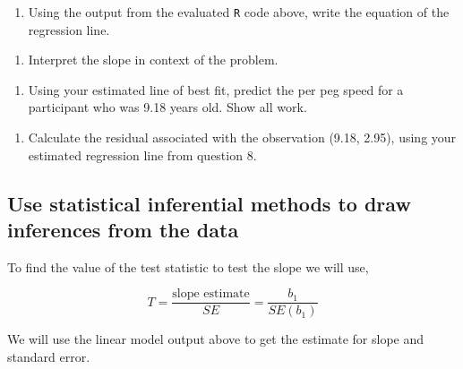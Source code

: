 \documentclass[
]{report}
\providecommand{\tightlist}{%
  \setlength{\itemsep}{0pt}\setlength{\parskip}{0pt}}
\begin{document}
\begin{enumerate}
\def\labelenumi{\arabic{enumi}.}
\setcounter{enumi}{7}
\tightlist
\item
  Using the output from the evaluated \texttt{R} code above, write the equation of the regression line.
\end{enumerate}

\vspace{1in}

\begin{enumerate}
\def\labelenumi{\arabic{enumi}.}
\setcounter{enumi}{8}
\tightlist
\item
  Interpret the slope in context of the problem.
\end{enumerate}

\vspace{1in}

\begin{enumerate}
\def\labelenumi{\arabic{enumi}.}
\setcounter{enumi}{9}
\tightlist
\item
  Using your estimated line of best fit, predict the per peg speed for a participant who was 9.18 years old. Show all work.
\end{enumerate}

\vspace{1in}

\begin{enumerate}
\def\labelenumi{\arabic{enumi}.}
\setcounter{enumi}{10}
\tightlist
\item
  Calculate the residual associated with the observation (9.18, 2.95), using your estimated regression line from question 8.
\end{enumerate}

\vspace{1in}

\hypertarget{use-statistical-inferential-methods-to-draw-inferences-from-the-data}{%
\subsection{Use statistical inferential methods to draw inferences from the data}\label{use-statistical-inferential-methods-to-draw-inferences-from-the-data}}

To find the value of the test statistic to test the slope we will use,

\[
T = \frac{\mbox{slope estimate}}{SE} = \frac{b_1}{SE(b_1)}
\]

We will use the linear model output above to get the estimate for slope and standard error.
\end{document}
